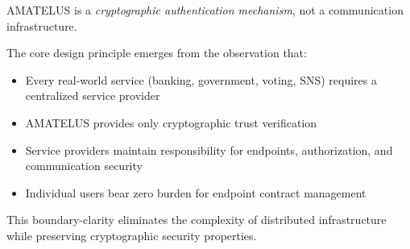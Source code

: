 AMATELUS is a \emph{cryptographic authentication mechanism}, not a communication infrastructure.

The core design principle emerges from the observation that:
\begin{itemize}
  \item Every real-world service (banking, government, voting, SNS) requires a centralized service provider
  \item AMATELUS provides only cryptographic trust verification
  \item Service providers maintain responsibility for endpoints, authorization, and communication security
  \item Individual users bear zero burden for endpoint contract management
\end{itemize}

This boundary-clarity eliminates the complexity of distributed infrastructure while preserving cryptographic security properties.

